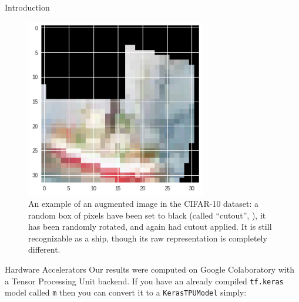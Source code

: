 \documentclass[final]{beamer}
\newlength{\onecolwid}
\begin{document}
\begin{frame}[t]
\begin{columns}[t]
\begin{column}{\onecolwid}
\begin{block}{Introduction}

  \begin{figure}
    \centering
    \includegraphics[width=0.70\textwidth]{ship.png}
    \caption{
    	An example of an augmented image in the CIFAR-10 dataset: a random box of pixels have been set to black (called ``cutout'', \cite{Devries2017}), it has been randomly rotated, and again had cutout applied. It is still recognizable as a ship, though its raw representation is completely different.}
    \label{fig:cutout_ship}
  \end{figure}
\end{block}



\begin{block}{Hardware Accelerators}
  Our results were computed on Google Colaboratory with a Tensor Processing Unit backend.
  If you have an already compiled \texttt{tf.keras} model called \texttt{m} then you can convert it to a \texttt{KerasTPUModel} simply:


\end{block}
\end{column}
\end{columns}
\end{frame}
\end{document}
